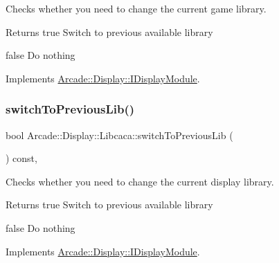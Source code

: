 Checks whether you need to change the current game library. 

\begin{DoxyReturn}{Returns}
true Switch to previous available library 

false Do nothing 
\end{DoxyReturn}


Implements \mbox{\hyperlink{classArcade_1_1Display_1_1IDisplayModule_a3bbbfe00907c8f3e4c7ef1aadedcc513}{Arcade\+::\+Display\+::\+I\+Display\+Module}}.

\mbox{\label{classArcade_1_1Display_1_1Libcaca_a2a195b508b59233ca226adfb9716754b}} 
\subsubsection{\texorpdfstring{switchToPreviousLib()}{switchToPreviousLib()}}
{\footnotesize\ttfamily bool Arcade\+::\+Display\+::\+Libcaca\+::switch\+To\+Previous\+Lib (\begin{DoxyParamCaption}{ }\end{DoxyParamCaption}) const\hspace{0.3cm}{\ttfamily [final]}, {\ttfamily [virtual]}}



Checks whether you need to change the current display library. 

\begin{DoxyReturn}{Returns}
true Switch to previous available library 

false Do nothing 
\end{DoxyReturn}


Implements \mbox{\hyperlink{classArcade_1_1Display_1_1IDisplayModule_a498d51597164e9f92e97ec2afee426b0}{Arcade\+::\+Display\+::\+I\+Display\+Module}}.

